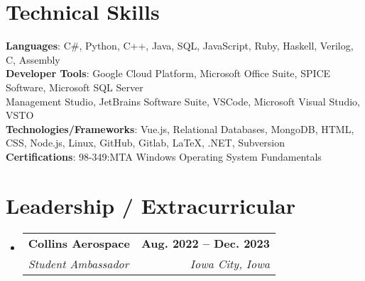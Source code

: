 \documentclass[letterpaper,11pt]{article}
\makeatletter
\newcommand{\resumeSubheading}[4]{
  \vspace{-2pt}\item
    \begin{tabular*}{1.0\textwidth}[t]{l@{\extracolsep{\fill}}r}
      \textbf{#1} & \textbf{\small #2} \\
      \textit{\small#3} & \textit{\small #4} \\
    \end{tabular*}\vspace{-7pt}
}
\newcommand{\resumeSubHeadingListStart}{\begin{itemize}[leftmargin=0.0in, label={}]}
\newcommand{\resumeItemListEnd}{\end{itemize}\vspace{-5pt}}
\makeatother
\begin{document}
\section{Technical Skills}
 \vspace{2pt}
 \begin{itemize}[leftmargin=0.15in, label={}]
    \small{\item{
     \textbf{Languages}{: C\#, Python, C++, Java, SQL, JavaScript, Ruby, Haskell, Verilog, C, Assembly} \\
     \textbf{Developer Tools}{: Google Cloud Platform, Microsoft Office Suite, SPICE Software, Microsoft SQL Server \\Management Studio, JetBrains Software Suite, VSCode, Microsoft Visual Studio, VSTO} \\
     \textbf{Technologies/Frameworks}{: Vue.js, Relational Databases, MongoDB, HTML, CSS, Node.js, Linux, GitHub, Gitlab, LaTeX, .NET, Subversion} \\
     \textbf{Certifications}{: 98-349:MTA Windows Operating System Fundamentals} \\
    }}
 \end{itemize}
 \vspace{-8pt}

\section{Leadership / Extracurricular}
    \resumeSubHeadingListStart
        \vspace{2pt}
        \resumeSubheading{Collins Aerospace}{Aug. 2022 -- Dec. 2023}{Student Ambassador}{Iowa City, Iowa} 
        \resumeItemListEnd
\vspace{.3 in}
\end{document}
